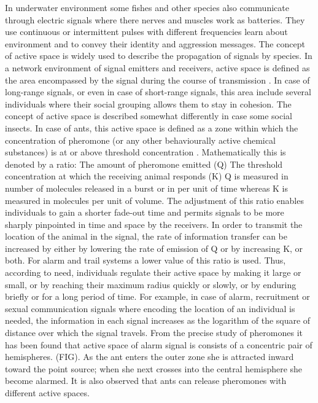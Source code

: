 In underwater environment some fishes and other species also communicate through electric signals where there nerves and muscles work as batteries. They use continuous or intermittent pulses with  different frequencies learn about environment and to convey their identity and aggression messages.
%
The concept of active space is widely used to describe the propagation of signals by species. In a network environment of signal emitters and receivers, active space is defined as the area encompassed by the signal  during the course of transmission \cite{Mcgregor2000}. In case of long-range signals, or even in case of short-range signals, this area include several individuals where their social grouping allows them to stay in cohesion. The concept of active space is described somewhat differently in case some social insects. In case of ants, this active space is defined as a zone within which the concentration of pheromone (or any other behaviourally active chemical substances) is  at or above threshold concentration \cite{Holldobler1990}. Mathematically this is denoted by a ratio:
The amount of pheromone emitted (Q)
The threshold concentration at which the receiving animal responds (K)
Q is measured in number of molecules released in a burst or in per unit of time whereas K is measured in molecules per unit of volume.
The adjustment of this ratio enables individuals to gain a shorter fade-out time and permits signals to be more sharply pinpointed in time and space by the receivers. In order to transmit the location of the animal in the signal, the rate of information transfer can be increased by either by lowering the rate of emission of Q or by increasing K, or both.  For alarm and trail systems a lower value of this ratio is used. Thus, according to need, individuals regulate their active space by making it large or small, or by reaching their maximum radius quickly or slowly, or by enduring briefly or for a long period of time. For example, in case of alarm, recruitment or sexual communication signals where encoding the location of an individual is needed, the information in each signal increases as the logarithm of the square of distance over which the signal travels. From the precise study of pheromones it has been found that active space of alarm signal is consists of  a concentric pair of hemispheres. (FIG). As the ant enters the outer zone she is attracted inward toward the point source; when she next crosses into the central hemisphere she become alarmed. It is also observed that ants can release pheromones with different active spaces.

